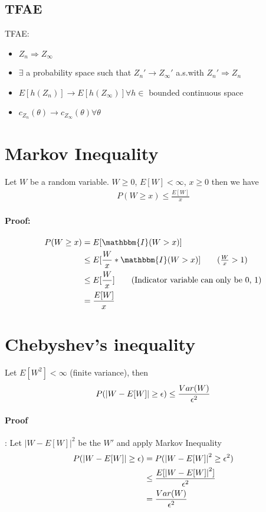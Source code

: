 \subsection{TFAE}
TFAE:  
    \begin{itemize}
        \item $Z_n \Rightarrow Z_\infty$
        \item $\exists$ a probability space such that $Z_n' \to Z_\infty'$ a.s.with $Z_n' \Rightarrow Z_n$
        \item $E[h(Z_n)] \to E[h(Z_\infty)] \forall h\in$ bounded continuous space \\
        \item $c_{Z_n}(\theta) \to c_{Z_\infty}(\theta) \forall \theta$
    \end{itemize}


\section{Markov Inequality}
Let $W$ be a random variable. $W \geq 0$, $E[W] < \infty$,  $x \geq 0$ then we have 
    \begin{align*}
        P(W \geq x) \leq \frac{E[W]}{x}
    \end{align*}
    
\paragraph{Proof:}
\begin{align*}
    P(W \geq x) 
    & = E[\mathbbm{I}(W > x)] \\
    & \leq E[\frac{W}{x} * \mathbbm{I}(W > x)] \tag{$\frac{W}{x} > 1$}\\
    & \leq E[\frac{W}{x}] \tag{Indicator variable can only be 0, 1}\\
    & = \frac{E[W]}{x}
\end{align*}



\section{Chebyshev's inequality}
Let $E[W^2] < \infty$ (finite variance), then 
\begin{align*}
    P(\left| W - E[W] \right| \geq \epsilon) \leq \frac{Var(W)}{\epsilon^2}
\end{align*}

\paragraph{Proof}: Let $|W - E[W]|^2$ be the $W'$ and apply Markov Inequality 
\begin{align*}
    P(\left| W - E[W] \right| \geq \epsilon)
    & = P(\left| W - E[W] \right|^2 \geq \epsilon^2)\\
    & \leq \frac{E[\left| W - E[W] \right|^2]}{\epsilon^2}\\
    & = \frac{Var(W)}{\epsilon^2}
\end{align*}




